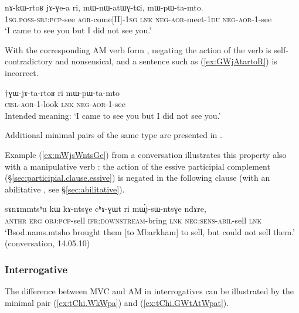 \begin{exe}
\ex \label{ex:nAkWrtoR}
\gll nɤ-kɯ-rtoʁ jɤ-ɣe-a ri, mɯ-nɯ-atɯɣ-tɕi, mɯ-pɯ-ta-mto. \\
\textsc{1sg}.\textsc{poss}-\textsc{sbj}:\textsc{pcp}-see \textsc{aor}-come[II]-\textsc{1sg} \textsc{lnk} \textsc{neg}-\textsc{aor}-meet-\textsc{1du} \textsc{neg}-\textsc{aor}-1-see \\
\glt `I came to see you but I did not see you.' 
\end{exe}

With the corresponding AM verb form , negating the action of the verb is self-contradictory and nonsensical, and a sentence such as (\ref{ex:GWjAtartoR}) is incorrect.

\begin{exe}
\ex \label{ex:GWjAtartoR}
\gll $\dagger$ɣɯ-jɤ-ta-rtoʁ ri mɯ-pɯ-ta-mto \\
\textsc{cisl}-\textsc{aor}-1-look \textsc{lnk} \textsc{neg}-\textsc{aor}-1-see \\
\glt Intended meaning: `I came to see you but I did not see you.' 
\end{exe}

Additional minimal pairs of the same type are presented in \citet[202--203]{jacques13harmonization}.

Example (\ref{ex:mWjsWntsGe}) from a conversation illustrates this property also with a manipulative verb : the action of the essive participial complement  (§\ref{sec:participial.clause.essive}) is negated in the following clause (with an abilitative , see §\ref{sec:abilitative}).

 \begin{exe}
\ex \label{ex:mWjsWntsGe}
 \gll   sɤnɤmmtsʰu kɯ kɤ-ntsɣe cʰɤ-ɣɯt ri mɯ́j-sɯ-ntsɣe ndɤre, \\
  \textsc{anthr} \textsc{erg} \textsc{obj}:\textsc{pcp}-sell \textsc{ifr}:\textsc{downstream}-bring \textsc{lnk} \textsc{neg}:\textsc{sens}-\textsc{abil}-sell \textsc{lnk} \\
\glt `Bsod.nams.mtsho brought them [to Mbarkham] to sell, but could not sell them.' (conversation, 14.05.10)
 \end{exe}

\subsubsection{Interrogative} \label{sec:am.interrogative}
The difference between MVC and AM in interrogatives can be illustrated by the minimal pair (\ref{ex:tChi.WkWpa}) and (\ref{ex:tChi.GWtAtWpat}). 

